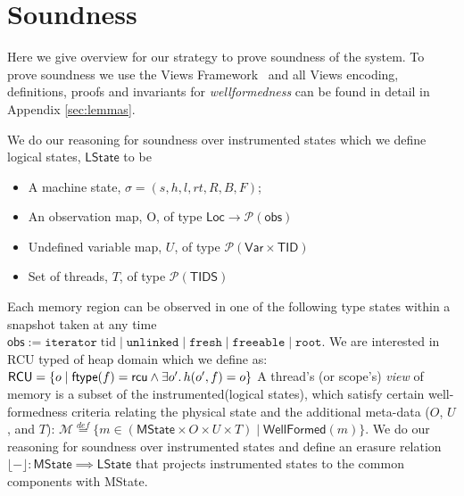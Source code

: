 \section{Soundness}
\label{sec:soundness}
Here we give overview for our strategy to prove soundness of the system. To prove soundness we use the Views Framework~\cite{views} and all Views encoding, definitions, proofs and invariants for \textit{wellformedness} can be found in detail in Appendix \ref{sec:lemmas}. 

We do our reasoning for soundness over instrumented states which we define logical states, $\textsf{LState}$ to be
\begin{itemize}
\item A machine state, $\sigma=(s,h,l,rt,R,B,F)$;
\item An observation map, O, of type $ \textsf{Loc} \to \mathcal{P}(\textsf{obs})$
\item Undefined variable map, $U$, of type $\mathcal{P}(\textsf{Var}\times \textsf{TID})$
\item Set of threads, $T$, of type $\mathcal{P}(\textsf{TIDS})$
\end{itemize}
Each memory region can be observed in one of the following type states within a snapshot taken at any time $\textsf{obs} := \texttt{iterator} \; \mathrm{tid} \mid \texttt{unlinked} \mid \texttt{fresh} \mid \texttt{freeable} \mid \texttt{root}$. We are interested in \textsf{RCU} typed of heap domain which we define as:$\textsf{RCU} = \{ o \mid \textsf{ftype}(f) = \textsf{rcu} \land \exists o' \ldotp h(o',f) = o \}$
A thread's (or scope's) \emph{view} of memory is a subset of the instrumented(logical states), which satisfy certain well-formedness criteria relating the physical state and the additional meta-data ($O$, $U$, and $T$):  $\mathcal{M} \stackrel{def}{=} \{ m \in (\textsf{MState} \times O \times U \times T) \mid  \textsf{WellFormed}(m) \}$.
We do our reasoning for soundness over instrumented states and define an erasure relation $\lfloor - \rfloor :\mathsf{MState} \implies \textsf{LState}$ that projects instrumented states to the common components with \textsf{MState}.


